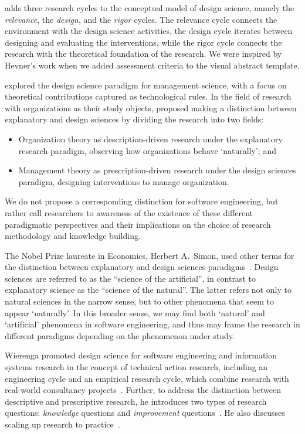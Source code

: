 \documentclass[graybox]{svmult}
\newcommand{\peggy}[1]{\textcolor{blue}{{\it [Peggy says: #1]}}}
\newcommand{\peggy}[1]{}
\begin{document}
\cite{Hevner2007} adds three research cycles to the conceptual model of design science, namely the \emph{relevance}, the \emph{design}, and the \emph{rigor} cycles. The relevance cycle connects the environment with the design science activities, the design cycle iterates between designing and evaluating the interventions, while the rigor cycle connects the research with the theoretical foundation of the research. We were inspired by Hevner's work when we added assessment criteria to the visual abstract template.


\cite{van_aken_management_2005} explored the design science paradigm for management science, with a focus on theoretical contributions captured as technological rules. 
In the field of research with organizations as their study objects, \cite{van_aken_management_2004} proposed making a distinction between explanatory and design sciences by dividing the research into two fields: 
\begin{itemize}
\item Organization theory as description-driven research under the explanatory research paradigm, observing how organizations behave `naturally'; and 
\item Management theory as prescription-driven research under the design sciences paradigm, designing interventions to manage organization.  
\end{itemize}

We do not propose a corresponding distinction for software engineering, but rather call researchers to awareness of the existence of these different paradigmatic perspectives and their implications on the choice of research methodology and knowledge building.

The Nobel Prize laureate in Economics, Herbert A.\ Simon, used other terms for the distinction between explanatory and design sciences paradigms~\citep{Simons69}. Design sciences are referred to as the ``science of the artificial'', in contrast to explanatory science as the ``science of the natural''. The latter refers not only to natural sciences in the narrow sense, but to other phenomena that seem to appear `naturally'. In this broader sense, we may find both `natural' and `artificial' phenomena in software engineering, and thus may frame the research in different paradigms depending on the phenomenon under study. 


Wierenga promoted design science for software engineering and information systems research in the concept of technical action research, including an engineering cycle and an empirical research cycle, which combine research with real-world consultancy projects~\citep{wieringa_six_2015,wieringa_technical_2012,wieringa_what_2014}. Further, to address the distinction between descriptive and prescriptive research, he introduces two types of research questions: \emph{knowledge} questions and \emph{improvement} questions~\citep{wieringa_design_2009}. He also discusses scaling up research to practice~\citep{Wieringa2014}. 
\end{document}
